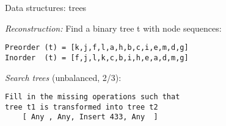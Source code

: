 \begin{slide}{Data structures: trees}

\emph{Reconstruction:}
Find a binary tree t with node sequences:
\begin{verbatim}
Preorder (t) = [k,j,f,l,a,h,b,c,i,e,m,d,g]
Inorder  (t) = [f,j,l,k,c,b,i,h,e,a,d,m,g]
\end{verbatim}

\bigskip

\emph{Search trees} (unbalanced, 2/3):
\begin{verbatim}
Fill in the missing operations such that 
tree t1 is transformed into tree t2
    [ Any , Any, Insert 433, Any  ]
\end{verbatim}



\end{slide}
